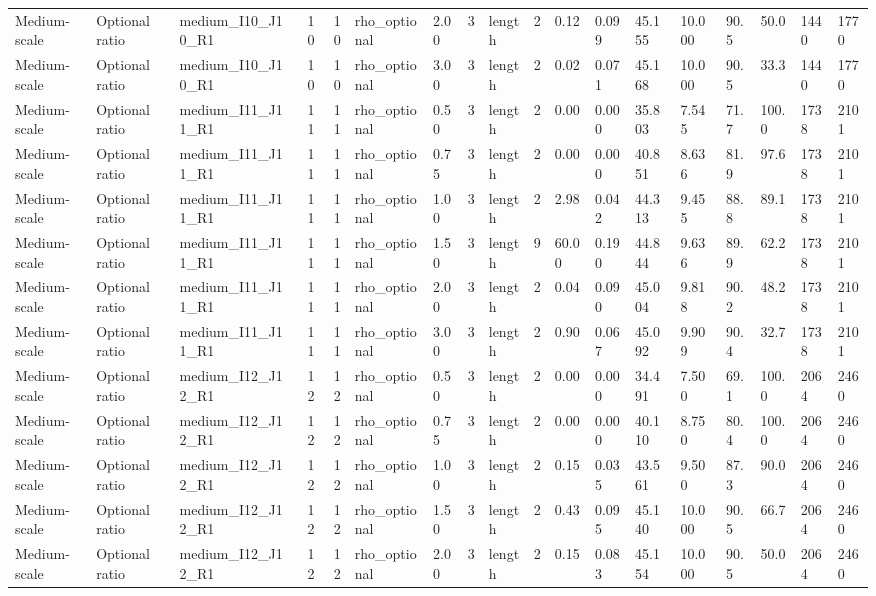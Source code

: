 \begin{longtable}{lllrrllllrllllllll}
Medium-scale & Optional ratio & medium\_I10\_J10\_R1 & 10 & 10 & rho\_optional & 2.00 & 3 & length & 2 & 0.12 & 0.099 & 45.155 & 10.000 & 90.5 & 50.0 & 1440 & 1770 \\
Medium-scale & Optional ratio & medium\_I10\_J10\_R1 & 10 & 10 & rho\_optional & 3.00 & 3 & length & 2 & 0.02 & 0.071 & 45.168 & 10.000 & 90.5 & 33.3 & 1440 & 1770 \\
Medium-scale & Optional ratio & medium\_I11\_J11\_R1 & 11 & 11 & rho\_optional & 0.50 & 3 & length & 2 & 0.00 & 0.000 & 35.803 & 7.545 & 71.7 & 100.0 & 1738 & 2101 \\
Medium-scale & Optional ratio & medium\_I11\_J11\_R1 & 11 & 11 & rho\_optional & 0.75 & 3 & length & 2 & 0.00 & 0.000 & 40.851 & 8.636 & 81.9 & 97.6 & 1738 & 2101 \\
Medium-scale & Optional ratio & medium\_I11\_J11\_R1 & 11 & 11 & rho\_optional & 1.00 & 3 & length & 2 & 2.98 & 0.042 & 44.313 & 9.455 & 88.8 & 89.1 & 1738 & 2101 \\
Medium-scale & Optional ratio & medium\_I11\_J11\_R1 & 11 & 11 & rho\_optional & 1.50 & 3 & length & 9 & 60.00 & 0.190 & 44.844 & 9.636 & 89.9 & 62.2 & 1738 & 2101 \\
Medium-scale & Optional ratio & medium\_I11\_J11\_R1 & 11 & 11 & rho\_optional & 2.00 & 3 & length & 2 & 0.04 & 0.090 & 45.004 & 9.818 & 90.2 & 48.2 & 1738 & 2101 \\
Medium-scale & Optional ratio & medium\_I11\_J11\_R1 & 11 & 11 & rho\_optional & 3.00 & 3 & length & 2 & 0.90 & 0.067 & 45.092 & 9.909 & 90.4 & 32.7 & 1738 & 2101 \\
Medium-scale & Optional ratio & medium\_I12\_J12\_R1 & 12 & 12 & rho\_optional & 0.50 & 3 & length & 2 & 0.00 & 0.000 & 34.491 & 7.500 & 69.1 & 100.0 & 2064 & 2460 \\
Medium-scale & Optional ratio & medium\_I12\_J12\_R1 & 12 & 12 & rho\_optional & 0.75 & 3 & length & 2 & 0.00 & 0.000 & 40.110 & 8.750 & 80.4 & 100.0 & 2064 & 2460 \\
Medium-scale & Optional ratio & medium\_I12\_J12\_R1 & 12 & 12 & rho\_optional & 1.00 & 3 & length & 2 & 0.15 & 0.035 & 43.561 & 9.500 & 87.3 & 90.0 & 2064 & 2460 \\
Medium-scale & Optional ratio & medium\_I12\_J12\_R1 & 12 & 12 & rho\_optional & 1.50 & 3 & length & 2 & 0.43 & 0.095 & 45.140 & 10.000 & 90.5 & 66.7 & 2064 & 2460 \\
Medium-scale & Optional ratio & medium\_I12\_J12\_R1 & 12 & 12 & rho\_optional & 2.00 & 3 & length & 2 & 0.15 & 0.083 & 45.154 & 10.000 & 90.5 & 50.0 & 2064 & 2460 \\

\end{longtable}
